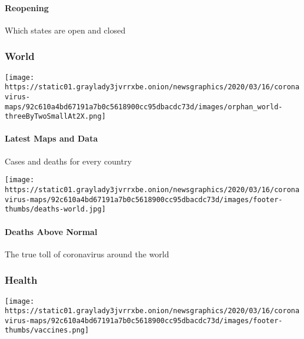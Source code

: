 \hypertarget{reopening}{%
\paragraph{Reopening}\label{reopening}}

Which states are open and closed

\hypertarget{world}{%
\subsubsection{World}\label{world}}

\href{https://www.nytimes3xbfgragh.onion/interactive/2020/world/coronavirus-maps.html}{}

\texttt{[image: https://static01.graylady3jvrrxbe.onion/newsgraphics/2020/03/16/coronavirus-maps/92c610a4bd67191a7b0c5618900cc95dbacdc73d/images/orphan\_world-threeByTwoSmallAt2X.png]}

\hypertarget{latest-maps-and-data-1}{%
\paragraph{Latest Maps and Data}\label{latest-maps-and-data-1}}

Cases and deaths for every country

\href{https://www.nytimes3xbfgragh.onion/interactive/2020/04/21/world/coronavirus-missing-deaths.html}{}

\texttt{[image: https://static01.graylady3jvrrxbe.onion/newsgraphics/2020/03/16/coronavirus-maps/92c610a4bd67191a7b0c5618900cc95dbacdc73d/images/footer-thumbs/deaths-world.jpg]}

\hypertarget{deaths-above-normal-1}{%
\paragraph{Deaths Above Normal}\label{deaths-above-normal-1}}

The true toll of coronavirus around the world

\hypertarget{health}{%
\subsubsection{Health}\label{health}}

\href{https://www.nytimes3xbfgragh.onion/interactive/2020/science/coronavirus-vaccine-tracker.html}{}

\texttt{[image: https://static01.graylady3jvrrxbe.onion/newsgraphics/2020/03/16/coronavirus-maps/92c610a4bd67191a7b0c5618900cc95dbacdc73d/images/footer-thumbs/vaccines.png]}

